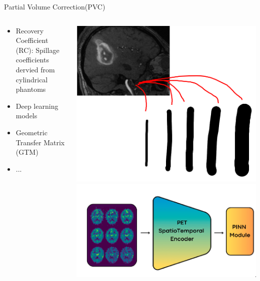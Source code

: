 \documentclass[aspectratio=169]{beamer}
\begin{document}
\begin{frame}[t]{Partial Volume Correction(PVC)}
	\begin{columns}
		\begin{column}{0.7\textwidth}
			\small
			\begin{itemize}
				\setlength\itemsep{2em}
				\item Recovery Coefficient (RC): Spillage coefficients dervied from cylindrical phantoms
				\item Deep learning models
				\item Geometric Transfer Matrix (GTM)
				\item ...
			\end{itemize}
		\end{column}
		\begin{column}{0.3\textwidth}
			\includegraphics[width=\linewidth]{rc.png}
			\includegraphics[width=\linewidth]{cnn.png}
		\end{column}
	\end{columns}
\end{frame}
\end{document}
